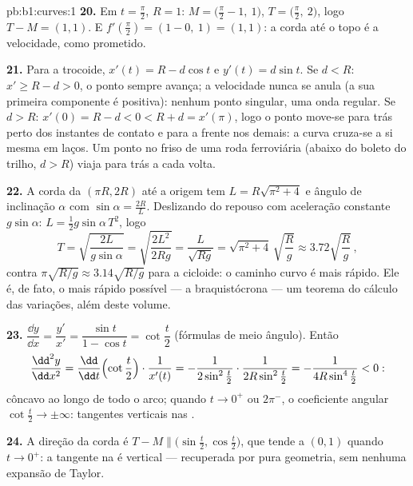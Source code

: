 \begin{solution}{pb:b1:curves:1}
\textbf{20.} Em $t = \frac\pi2$, $R = 1$: $M = \bigl(\frac\pi2 -
1,\ 1\bigr)$, $T = \bigl(\frac\pi2,\ 2\bigr)$, logo $T - M = (1,
1)$. E $f'(\frac\pi2) = (1 - 0,\ 1) = (1, 1)$: a
corda até o topo é a velocidade, como prometido.

\textbf{21.} Para a trocoide, $x'(t) = R - d\cos t$ e $y'(t)
= d\sin t$. Se $d < R$: $x' \geq R - d > 0$, o
ponto sempre avança; a velocidade nunca se anula (a sua primeira
componente é positiva): nenhum ponto singular, uma onda regular. Se
$d > R$: $x'(0)
= R - d < 0 < R + d = x'(\pi)$, logo o ponto move-se para trás perto dos instantes de
contato e para a frente nos demais: a curva cruza-se a si mesma em
laços. Um ponto no friso de uma roda ferroviária (abaixo do boleto do
trilho, $d > R$) viaja para trás a cada volta.

\textbf{22.} A corda da  $(\pi R, 2R)$ até a origem tem 
$L = R\sqrt{\pi^2 + 4}$ e ângulo de inclinação $\alpha$ com $\sin\alpha = \frac{2R}{L}$. Deslizando do
repouso com aceleração constante $g\sin\alpha$: $L = \frac12 g\sin\alpha\,T^2$, logo
\[
T = \sqrt{\frac{2L}{g\sin\alpha}} = \sqrt{\frac{2L^2}{2Rg}}
= \frac{L}{\sqrt{Rg}} = \sqrt{\pi^2 + 4}\,\sqrt{\frac Rg}
\approx 3.72\sqrt{\frac Rg}\,,
\]
contra $\pi\sqrt{R/g} \approx 3.14\sqrt{R/g}$ para a cicloide: o caminho curvo é mais rápido. Ele é,
de fato, o mais rápido possível --- a braquistócrona --- um teorema
do cálculo das variações, além deste volume.

\textbf{23.} $\dfrac{\dd y}{\dd x} = \dfrac{y'}{x'} =
\dfrac{\sin t}{1 - \cos t} = \cot\dfrac t2$ (fórmulas de meio ângulo). Então
\[
\frac{\dd^2y}{\dd x^2}
= \frac{\dd}{\dd t}\Bigl(\cot\frac t2\Bigr)\cdot\frac{1}{x'(t)}
= -\frac{1}{2\sin^2\frac t2}\cdot\frac{1}{2R\sin^2\frac t2}
= -\frac{1}{4R\sin^4\frac t2} < 0 :
\]
côncavo ao longo de todo o arco; quando $t \to 0^+$ ou $2\pi^-$, o
coeficiente angular $\cot\frac t2 \to \pm\infty$: tangentes verticais nas .

\textbf{24.} A direção da corda é $T - M \parallel
\bigl(\sin\frac t2, \cos\frac t2\bigr)$, que tende a $(0, 1)$ quando
$t \to 0^{+}$: a tangente na  é vertical --- recuperada por pura
geometria, sem nenhuma expansão de Taylor.


\end{solution}
